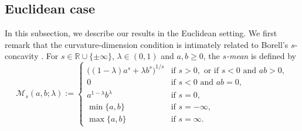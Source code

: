 \documentclass[sts]{imsart}
\theoremstyle{definition}
\theoremstyle{remark}
\newcommand{\R}{\mathbb{R}}
\newcommand{\fm}{\mathfrak{m}}
\newcommand{\dist}{\mathrm{d}}
\newcommand{\CD}{\mathrm{CD}}
\newcommand{\veb}[1]{\textcolor{blue}{\textbf{VEB:}  #1}}
\begin{document}
\subsection{Euclidean case}%

In this subsection, we describe our results in the Euclidean setting.
We first remark that the curvature-dimension condition is intimately related to Borell's $s$-concavity \cite{Borell}.
For $s \in \R \cup \{\pm\infty\}$, $\lambda \in (0,1)$ and $a,b\geq 0$, the \emph{$s$-mean} is defined by
\[
\mathcal{M}_s(a,b;\lambda) :=\begin{cases}
\bigl( (1-\lambda)a^s +\lambda b^s \bigr)^{1/s} &\text{if } s>0, \text{ or if } s<0 \text{ and } ab>0 ,\\
0 &\text{if } s<0 \text{ and } ab=0, \\
a^{1-\lambda} b^\lambda &\text{if } s=0, \\
\min\{ a,b \} &\text{if } s=-\infty, \\
\max\{ a,b \} &\text{if } s=\infty.
\end{cases}
\]
%
\end{document}
